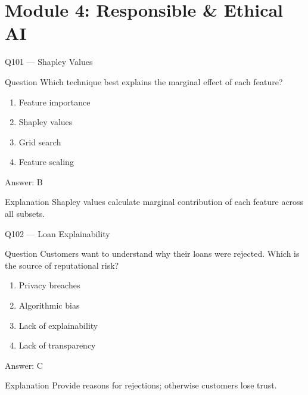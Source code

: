 \documentclass[aspectratio=169,8pt]{beamer}
\begin{document}
	\section{Module 4: Responsible \& Ethical AI}
	
	\begin{frame}{Q101 --- Shapley Values}
		\begin{block}{Question}
			Which technique best explains the marginal effect of each feature?
		\end{block}
		\begin{enumerate}
			\item Feature importance
			\item Shapley values
			\item Grid search
			\item Feature scaling
		\end{enumerate}
		\begin{exampleblock}{Answer: B}\end{exampleblock}
		\begin{block}{Explanation}
			Shapley values calculate marginal contribution of each feature across all subsets.
		\end{block}
	\end{frame}
	
	\begin{frame}{Q102 --- Loan Explainability}
		\begin{block}{Question}
			Customers want to understand why their loans were rejected. Which is the source of reputational risk?
		\end{block}
		\begin{enumerate}
			\item Privacy breaches
			\item Algorithmic bias
			\item Lack of explainability
			\item Lack of transparency
		\end{enumerate}
		\begin{exampleblock}{Answer: C}\end{exampleblock}
		\begin{block}{Explanation}
			Provide reasons for rejections; otherwise customers lose trust.
		\end{block}
	\end{frame}
	
\end{document}
